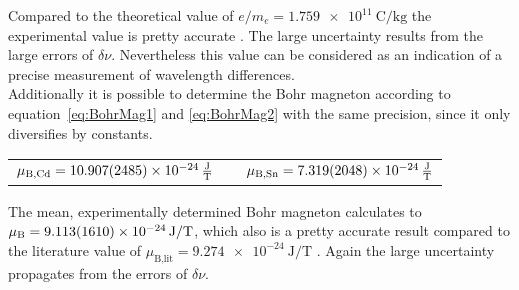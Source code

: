 Compared to the theoretical value of $e/m_e = \SI{1.759 e11}{\coulomb/\kg}$ the experimental value is pretty accurate \cite{SpecificChargeLit}. 
The large uncertainty results from the large errors of $\delta\nu$. 
Nevertheless this value can be considered as an indication of a precise measurement of wavelength differences.
\\
Additionally it is possible to determine the Bohr magneton according to equation~\ref{eq:BohrMag1} and \ref{eq:BohrMag2} with the same precision, since it only diversifies by constants.
\begin{table}[ht]
	\centering
	\begin{tabular}{c p{2.0cm} c}
		$\mu_\text{B,Cd} = \SI[per-mode=fraction]{10.907 \pm 2.485 e-24}{\joule\per\tesla}$	& 	& $\mu_\text{B,Sn} = \SI[per-mode=fraction]{7.319 \pm 2.048 e-24}{\joule\per\tesla}$
	\end{tabular}
\end{table}
The mean, experimentally determined Bohr magneton calculates to $\mu_\text{B} = \SI{9.113 \pm 1.610 e-24}{\joule/\tesla}$, which also is a pretty accurate result compared to the literature value of $\mu_\text{B,lit} = \SI{9.274 e-24}{\joule/\tesla}$ \cite{Povh}. 
Again the large uncertainty propagates from the errors of $\delta\nu$.
